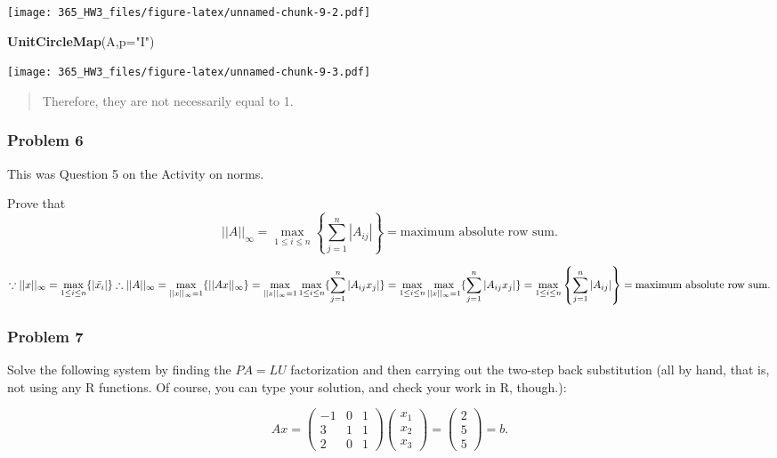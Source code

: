 \documentclass[]{article}
\newenvironment{Shaded}{\begin{snugshade}}{\end{snugshade}}
\newcommand{\DataTypeTok}[1]{\textcolor[rgb]{0.13,0.29,0.53}{#1}}
\newcommand{\KeywordTok}[1]{\textcolor[rgb]{0.13,0.29,0.53}{\textbf{#1}}}
\newcommand{\NormalTok}[1]{#1}
\newcommand{\StringTok}[1]{\textcolor[rgb]{0.31,0.60,0.02}{#1}}
\begin{document}
\texttt{[image: 365\_HW3\_files/figure-latex/unnamed-chunk-9-2.pdf]}

\begin{Shaded}
\begin{Highlighting}[]
\KeywordTok{UnitCircleMap}\NormalTok{(A,}\DataTypeTok{p=}\StringTok{"I"}\NormalTok{)}
\end{Highlighting}
\end{Shaded}

\texttt{[image: 365\_HW3\_files/figure-latex/unnamed-chunk-9-3.pdf]}

\begin{quote}
Therefore, they are not necessarily equal to 1.
\end{quote}

\hypertarget{problem-6}{%
\subsubsection{Problem 6}\label{problem-6}}

This was Question 5 on the Activity on norms.

Prove that
\[ ||A||_{\infty}=\max_{1 \leq i \leq n}\left\{ \sum_{j=1}^n |A_{ij}| \right\}=\text{maximum absolute row sum}.\]


\iffalse{} {Proof. } \fi{}\[
\because ||x||_{\infty} = \max_{1 \leq i\leq n}\{|\bar{x_i}|\}\\
\therefore ||A||_{\infty}=\max_{||x||_{\infty}=1}\{||Ax||_{\infty}\}=\max_{||x||_{\infty}=1}\max_{1 \leq i \leq n}\{\sum^{n}_{j=1}|A_{ij}x_{j}|\}=\max_{1 \leq i \leq n}\max_{||x||_{\infty}=1}\{\sum^{n}_{j=1}|A_{ij}x_{j}|\} \\= 
\max_{1 \leq i \leq n}\left\{ \sum_{j=1}^n |A_{ij}| \right\}=\text{maximum absolute row sum}.
\]


\hypertarget{problem-7}{%
\subsubsection{Problem 7}\label{problem-7}}

Solve the following system by finding the \(PA=LU\) factorization and
then carrying out the two-step back substitution (all by hand, that is,
not using any R functions. Of course, you can type your solution, and
check your work in R, though.):

\[ Ax=\begin{pmatrix}-1 & 0 & 1 \\
3 & 1 & 1 \\
2 & 0 & 1 
\end{pmatrix} \begin{pmatrix} x_1 \\ x_2\\ x_3\end{pmatrix}=\begin{pmatrix} 2 \\ 5 \\ 5 \end{pmatrix}=b. \]
\end{document}
